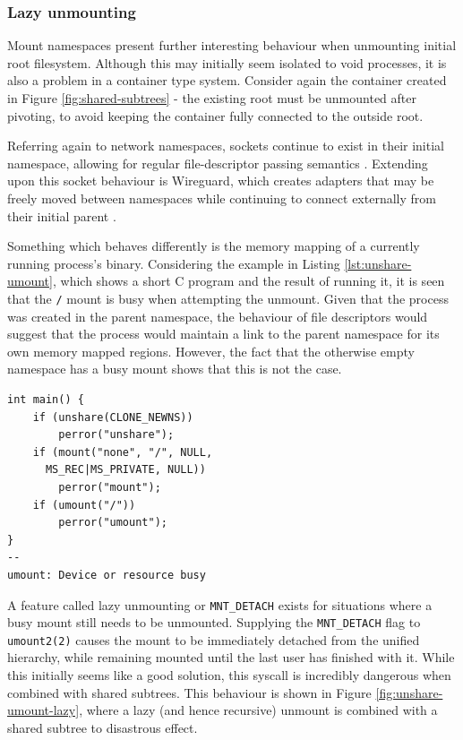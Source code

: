 \documentclass[sigplan]{acmart}
\begin{document}
\subsubsection{Lazy unmounting}

Mount namespaces present further interesting behaviour when unmounting initial root filesystem. Although this may initially seem isolated to void processes, it is also a problem in a container type system. Consider again the container created in Figure \ref{fig:shared-subtrees} - the existing root must be unmounted after pivoting, to avoid keeping the container fully connected to the outside root.

Referring again to network namespaces, sockets continue to exist in their initial namespace, allowing for regular file-descriptor passing semantics \citep{biederman_re_2007}. Extending upon this socket behaviour is Wireguard, which creates adapters that may be freely moved between namespaces while continuing to connect externally from their initial parent \citep[§7.3]{donenfeld_wireguard_2017}.

Something which behaves differently is the memory mapping of a currently running process's binary. Considering the example in Listing \ref{lst:unshare-umount}, which shows a short C program and the result of running it, it is seen that the \texttt{/} mount is busy when attempting the unmount. Given that the process was created in the parent namespace, the behaviour of file descriptors would suggest that the process would maintain a link to the parent namespace for its own memory mapped regions. However, the fact that the otherwise empty namespace has a busy mount shows that this is not the case.

\begin{lstlisting}[float,label={lst:unshare-unmount}]
int main() {
	if (unshare(CLONE_NEWNS))
		perror("unshare");
	if (mount("none", "/", NULL,
	  MS_REC|MS_PRIVATE, NULL))
		perror("mount");
	if (umount("/"))
		perror("umount");
}
--
umount: Device or resource busy
\end{lstlisting}

A feature called lazy unmounting or \texttt{MNT\_DETACH} exists for situations where a busy mount still needs to be unmounted. Supplying the \texttt{MNT\_DETACH} flag to \texttt{umount2(2)} causes the mount to be immediately detached from the unified hierarchy, while remaining mounted until the last user has finished with it. While this initially seems like a good solution, this syscall is incredibly dangerous when combined with shared subtrees. This behaviour is shown in Figure \ref{fig:unshare-umount-lazy}, where a lazy (and hence recursive) unmount is combined with a shared subtree to disastrous effect.
\end{document}
